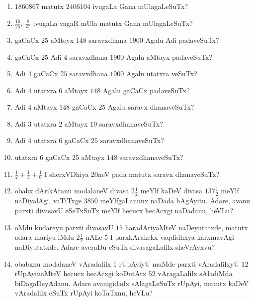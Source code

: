\begin{enumerate}
\item $1860867$ matutx $2406104$ ivugaLa Gana mUlagaLeSuTx?

\item $\frac{16}{25}$, $\frac{8}{27}$ ivugaLa vagaR mUla matutx Gana
mUlagaLeSuTx? 

\item gaCaCx $25$ aMteyx $148$ saravxdhana $1900$ Agalu Adi
padaveSuTx?

\item gaCaCx $25$ Adi $4$ saravxdhana $1900$ Agalu aMtayx padaveSuTx?

\item Adi $4$ gaCaCx $25$ saravxdhana $1900$ Agalu utatxra veSuTx?

\item Adi $4$ utatxra $6$ aMtayx $148$ Agalu gaCaCx padaveSuTx?

\item Adi $4$ aMtayx $148$ gaCaCx $25$ Agalu saravx dhanaveSuTx?

\item Adi $3$ utatxra $2$ aMtayx $19$ saravxdhanaveSuTx?

\item Adi $4$ utatxra $6$ gaCaCx $25$ saravxdhanaveSuTx?

\item utatxra $6$ gaCaCx $25$ aMtayx $148$ saravxdhanaveSuTx?

\item $\frac{1}{2}+ \frac{1}{3} + \frac{1}{6}$ I sherxVDhiya $20$neV
pada matutx saravx dhanaveSuTx?

\item obabx dArikAranu modalaneV divasa $2\frac{1}{2}$ meYlf kaDeV
divasa $137\frac{1}{2}$ meYlf naDiyalAgi, vaTiTxge $3850$
meYlfgaLanunx naDada hAgAyitu. Adare, avanu parxti divasavU eSeTxSuTx
meYlf hecucx hecAcxgi naDadanu, heVLu?

\item oMdu kudareyu parxti divasavU $15$ haradAriyaMteV naDeyutatxde,
matutx adara mariyu iMdu $2 \frac{1}{2}$ nALe $5$ I parxkArakekx
vaqdidhxya karxmavAgi naDiyutatxde. Adare averaDu eSuTx divasagaLalilx
sheVrAyxvu? 

\item obabxnu modalaneV vAradalilx $1$ rUpAyiyU muMde parxti
vAradalilxyU $12$ rUpAyinaMteV hecucx hecAcxgi koDutAtx $52$
vAragaLalilx sAladiMda biDagaDeyAdanu. Adare avanigidadx sAlagaLeSuTx
rUpAyi, matutx kaDeV vAradalilx eSuTx rUpAyi koTaTxnu, heVLu?


\end{enumerate}
